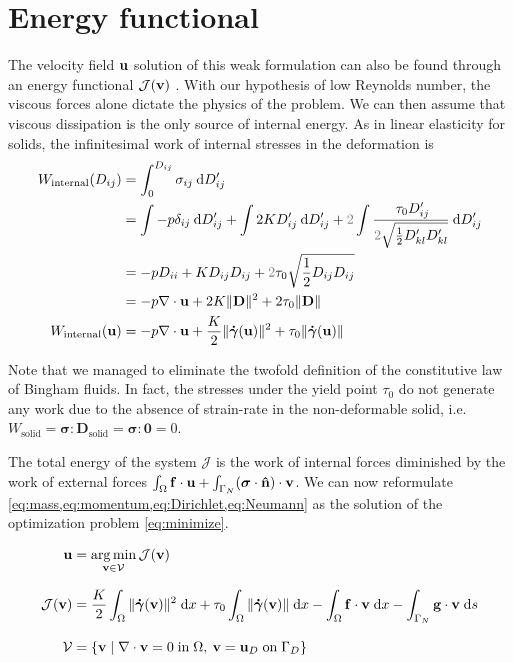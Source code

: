 \documentclass[11 pt]{report}
\begin{document}
\section{Energy functional}

The velocity field $\mathbf{u}$ solution of this weak formulation can also be found through an energy functional $\mathcal{J}(\mathbf{v})$ \cite{saramito2016complex, Bleyer}. With our hypothesis of low Reynolds number, the viscous forces alone dictate the physics of the problem. We can then assume that viscous dissipation is the only source of internal energy. As in linear elasticity for solids, the infinitesimal work of internal stresses in the deformation is
\begin{equation}
    \begin{aligned}
        W_{\textrm{internal}}(D_{ij}) &= \int_{0}^{D_{ij}} \sigma_{ij} \:\dd D_{ij}'\\
        &= \int -p\delta_{ij} \:\dd D_{ij}' + \int 2K D_{ij}' \:\dd D_{ij}' + {\color{gray} 2} \int \frac{ \: \tau_0 D_{ij}'}{{\color{gray} 2} \sqrt{\frac{1}{2} D_{kl}'D_{kl}'}} \:\dd D_{ij}'\\
        &= -p D_{ii} + K D_{ij} D_{ij} + {\color{gray} 2} \tau_0 \sqrt{\frac{1}{2} D_{ij} D_{ij}}\\
        &= -p \nabla \cdot \uu + 2K \|\mathbf{D}\|^2 + 2\tau_0 \|\mathbf{D}\|\\
        W_{\textrm{internal}}(\uu) &= -p \nabla \cdot \uu + \frac{K}{2} \|\gam(\uu)\|^2 + \tau_0 \|\gam(\uu)\|
    \end{aligned}
    \label{eq:energy_density}
\end{equation}

Note that we managed to eliminate the twofold definition of the constitutive law of Bingham fluids. In fact, the stresses under the yield point $\tau_0$ do not generate any work due to the absence of strain-rate in the non-deformable solid, i.e. $W_{\text{solid}}=\boldsymbol\sigma:\mathbf{D}_{\text{solid}}=\boldsymbol\sigma : \mathbf{0} = 0$.

The total energy of the system $\mathcal{J}$ is the work of internal forces diminished by the work of external forces $\int_{\Omega} \mathbf{f} \cdot \mathbf{u} + \int_{\Gamma_N} (\boldsymbol \sigma \cdot \mathbf{\hat n}) \cdot \mathbf{v}$. We can now reformulate \cref{eq:mass,eq:momentum,eq:Dirichlet,eq:Neumann} as the solution of the optimization problem \eqref{eq:minimize}.
\begin{empheqboxed}
\begin{equation}
    \begin{aligned}
        \mathbf{u} &= \operatorname*{arg\,min}_{\mathbf{v} \in \mathcal{V}} \mathcal{J}(\mathbf{v})\\[8pt]
        \mathcal{J}(\mathbf{v}) &= \frac{K}{2}\int_{\Omega} \|\boldsymbol{\dot \gamma}(\mathbf{v})\|^2 \;\dd x + \tau_0 \int_{\Omega} \|\boldsymbol{\dot \gamma}(\mathbf{v})\| \;\dd x - \int_{\Omega} \mathbf{f}\cdot \mathbf{v} \; \dd x - \int_{\Gamma_N} \mathbf{g} \cdot \mathbf{v} \;\dd s\\[8pt]
        \mathcal{V} &= \{\mathbf{v} \;\vert\; \nabla \cdot \mathbf{v} = 0 \; \text{in} \; \Omega, \: \mathbf{v} = \mathbf{u}_{D} \;\text{on}\; \Gamma_D \}
    \end{aligned}\label{eq:minimize}
\end{equation}
\end{empheqboxed}
\end{document}
